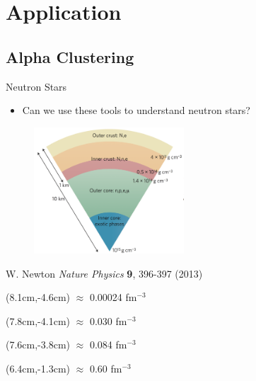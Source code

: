 \documentclass{beamer}
\begin{document}
\section{Application}
\subsection{Alpha Clustering}
\begin{frame}{Neutron Stars}
\begin{itemize}
   \item Can we use these tools to understand neutron stars?
\end{itemize}
\begin{figure}[h]
   \centering
   \includegraphics[width=0.5\textwidth]{neutronstar.png}
\end{figure}
W. Newton {\it Nature Physics} {\bf 9}, 396-397 (2013)
\begin{textblock*}{\textwidth}(8.1cm,-4.6cm) %
   \tiny $\approx$ 0.00024 fm$^{-3}$
\end{textblock*}
\begin{textblock*}{\textwidth}(7.8cm,-4.1cm) %
   \tiny $\approx$ 0.030 fm$^{-3}$
\end{textblock*}
\begin{textblock*}{\textwidth}(7.6cm,-3.8cm) %
   \tiny $\approx$ 0.084 fm$^{-3}$
\end{textblock*}
\begin{textblock*}{\textwidth}(6.4cm,-1.3cm) %
   \tiny $\approx$ 0.60 fm$^{-3}$
\end{textblock*}
\end{frame}
\end{document}
